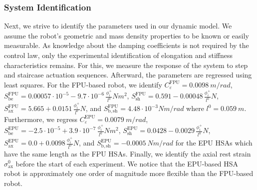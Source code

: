 \subsubsection{System Identification}\label{ssub:hsamodel:planar_hsa_robot_model:model_verification:system_identification}
Next, we strive to identify the parameters used in our dynamic model.
We assume the robot's geometric and mass density properties to be known or easily measurable. %
As knowledge about the damping coefficients is not required by the control law, only the experimental identification of elongation and stiffness characteristics remains.
For this, we measure the response of the system to step and staircase actuation sequences. Afterward, the parameters are regressed using least squares. %
For the FPU-based robot, we identify $C_\varepsilon^\mathrm{FPU}=\SI{0.0098}{m \per rad}$, $S_\mathrm{be}^\mathrm{FPU} = 0.00057 \cdot 10^{-5} - 9.7 \cdot 10^{-6} \, \frac{\phi_i^+}{l^0} \si{Nm^2}$, $S_\mathrm{sh}^\mathrm{FPU} = 0.591 - 0.00048 \, \frac{\phi_i^+}{l^0} \si{N}$, $S_\mathrm{ax}^\mathrm{FPU} = 5.665 + 0.0151 \, \frac{\phi_i^+}{l^0} \si{N}$, and $S_\mathrm{b,sh}^\mathrm{FPU} = 4.48 \cdot 10^{-3} \si{Nm \per rad}$ where $l^0 = \SI{0.059}{m}$. 
Furthermore, we regress $C_\varepsilon^\mathrm{EPU}=\SI{0.0079}{m \per rad}$, $S_\mathrm{be}^\mathrm{EPU} = -2.5 \cdot 10^{-5} + 3.9 \cdot 10^{-7} \, \frac{\phi_i^+}{l^0} \si{Nm^2}$, $S_\mathrm{sh}^\mathrm{EPU} = 0.0428 - 0.0029 \, \frac{\phi_i^+}{l^0} \si{N}$, $S_\mathrm{ax}^\mathrm{EPU} = 0.0 + 0.0098 \, \frac{\phi_i^+}{l^0} \si{N}$, and $S_\mathrm{b,sh}^\mathrm{EPU} = -\SI{0.0005}{Nm \per rad}$ for the EPU \glspl{HSA} which have the same length as the FPU \glspl{HSA}.
Finally, we identify the axial rest strain $\sigma_\mathrm{ax}^0$ before the start of each experiment.
We notice that the EPU-based HSA robot is approximately one order of magnitude more flexible than the FPU-based robot.

